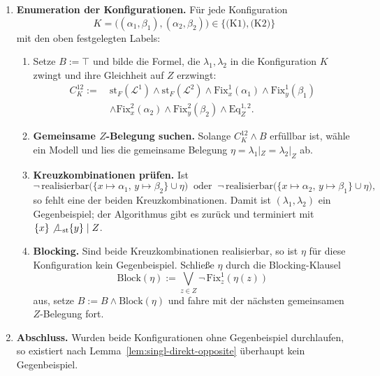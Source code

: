 \begin{enumerate}
    \item \textbf{Enumeration der Konfigurationen.} Für jede Konfiguration
    \[
        K=\bigl((\alpha_1,\beta_1),(\alpha_2,\beta_2)\bigr)\in\{\text{(K1)},\text{(K2)}\}
    \]
    mit den oben festgelegten Labels:
    \begin{enumerate}
        \item Setze \(B:=\top\) und bilde die Formel, die
        \(\lambda_1,\lambda_2\) in die Konfiguration \(K\) zwingt und ihre
        Gleichheit auf \(Z\) erzwingt:
        \[
        \begin{aligned}
            C^{12}_{K}
            :=\ &
            \mathrm{st}_F(\mathcal L^1)\land\mathrm{st}_F(\mathcal L^2)
            \land\mathrm{Fix}^1_x(\alpha_1)\land\mathrm{Fix}^1_y(\beta_1)\\
            &\land\mathrm{Fix}^2_x(\alpha_2)\land\mathrm{Fix}^2_y(\beta_2)
            \land\mathrm{Eq}^{1,2}_Z.
        \end{aligned}
        \]
        \item \textbf{Gemeinsame \(Z\)-Belegung suchen.} Solange
        \(C^{12}_{K}\land B\) erfüllbar ist, wähle ein Modell und lies die
        gemeinsame Belegung \(\eta=\lambda_1|_Z=\lambda_2|_Z\) ab. 
        \item \textbf{Kreuzkombinationen prüfen.} Ist
        \[
            \neg\,\mathrm{realisierbar}\bigl(\{x\mapsto\alpha_1,\,y\mapsto\beta_2\}\cup\eta\bigr)
            \ \text{ oder }\
            \neg\,\mathrm{realisierbar}\bigl(\{x\mapsto\alpha_2,\,y\mapsto\beta_1\}\cup\eta\bigr),
        \]
        so fehlt eine der beiden Kreuzkombinationen. Damit ist
        \((\lambda_1,\lambda_2)\) ein Gegenbeispiel; der Algorithmus gibt es
        zurück und terminiert mit \(\{x\}\not\bot_{\mathrm{st}}\{y\}\mid Z\).
        \item \textbf{Blocking.} Sind beide Kreuzkombinationen realisierbar,
        so ist \(\eta\) für diese Konfiguration kein Gegenbeispiel. Schließe
        \(\eta\) durch die Blocking-Klausel
        \[
            \mathrm{Block}(\eta):=\bigvee_{z\in Z}\neg\,\mathrm{Fix}^1_z(\eta(z))
        \]
        aus, setze \(B:=B\land\mathrm{Block}(\eta)\) und fahre mit der
        nächsten gemeinsamen \(Z\)-Belegung fort.
    \end{enumerate}

    \item \textbf{Abschluss.} Wurden beide Konfigurationen ohne Gegenbeispiel
    durchlaufen, so existiert nach Lemma~\ref{lem:singl-direkt-opposite}
    überhaupt kein Gegenbeispiel.
\end{enumerate}

